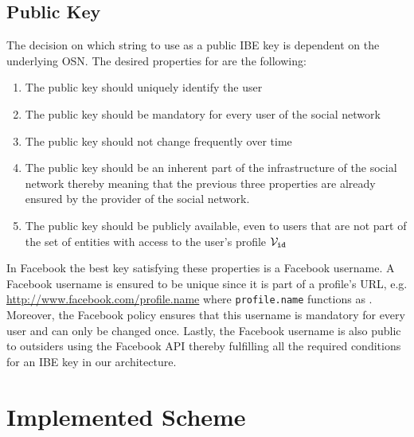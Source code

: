 \subsection{Public Key}
The decision on which string to use as a public IBE key \id{} is dependent on the underlying OSN. The desired properties for \id{} are the following:
\begin{enumerate}
 \item The public key should uniquely identify the user
 \item The public key should be mandatory for every user of the social network
 \item The public key should not change frequently over time
 \item The public key should be an inherent part of the infrastructure of the social network thereby meaning that the previous three properties are already ensured by the provider of the social network.
 \item The public key should be publicly available, even to users that are not part of the set of entities with access to the user's profile $\mathcal{V}_{\mathtt{id}_{}}$
\end{enumerate}
In Facebook the best key satisfying these properties is a Facebook username. A Facebook username is ensured to be unique since it is part of a profile's URL, e.g. \url{http://www.facebook.com/profile.name} where \texttt{profile.name} functions as \id{}. Moreover, the Facebook policy ensures that this username is mandatory for every user and can only be changed once. Lastly, the Facebook username is also public to outsiders using the Facebook API thereby fulfilling all the required conditions for an IBE key in our architecture.

\section{Implemented Scheme}

